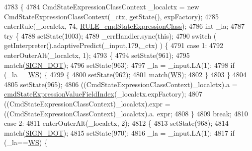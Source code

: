 \begin{DoxyCode}
4783                                                                                                            
                           \{
4784     CmdStateExpressionClassContext \_localctx = \textcolor{keyword}{new} CmdStateExpressionClassContext(\_ctx, getState(), 
      expFactory);
4785     enterRule(\_localctx, 74, \hyperlink{classgov_1_1nasa_1_1jpf_1_1inspector_1_1server_1_1expression_1_1parser_1_1_expression_grammar_parser_ae2659147bb430d58143ab16a6eb73b15}{RULE\_cmdStateExpressionClass});
4786     \textcolor{keywordtype}{int} \_la;
4787     \textcolor{keywordflow}{try} \{
4788       setState(1003);
4789       \_errHandler.sync(\textcolor{keyword}{this});
4790       \textcolor{keywordflow}{switch} ( getInterpreter().adaptivePredict(\_input,179,\_ctx) ) \{
4791       \textcolor{keywordflow}{case} 1:
4792         enterOuterAlt(\_localctx, 1);
4793         \{
4794         setState(961);
4795         match(\hyperlink{classgov_1_1nasa_1_1jpf_1_1inspector_1_1server_1_1expression_1_1parser_1_1_expression_grammar_parser_af578d1cac8553bcf6f52608a4e9125f1}{SIGN\_DOT});
4796         setState(963);
4797         \_la = \_input.LA(1);
4798         \textcolor{keywordflow}{if} (\_la==\hyperlink{classgov_1_1nasa_1_1jpf_1_1inspector_1_1server_1_1expression_1_1parser_1_1_expression_grammar_parser_ace44714ae633c7b14794cc5a24d9ebf3}{WS}) \{
4799           \{
4800           setState(962);
4801           match(\hyperlink{classgov_1_1nasa_1_1jpf_1_1inspector_1_1server_1_1expression_1_1parser_1_1_expression_grammar_parser_ace44714ae633c7b14794cc5a24d9ebf3}{WS});
4802           \}
4803         \}
4804 
4805         setState(965);
4806         ((CmdStateExpressionClassContext)\_localctx).a = 
      \hyperlink{classgov_1_1nasa_1_1jpf_1_1inspector_1_1server_1_1expression_1_1parser_1_1_expression_grammar_parser_a300497ebff4ec0759e1a294e9d6a7920}{cmdStateExpressionValueFieldIndex}(\_localctx.expFactory);
4807          ((CmdStateExpressionClassContext)\_localctx).expr =  ((CmdStateExpressionClassContext)\_localctx).a.
      expr; 
4808         \}
4809         \textcolor{keywordflow}{break};
4810       \textcolor{keywordflow}{case} 2:
4811         enterOuterAlt(\_localctx, 2);
4812         \{
4813         setState(968);
4814         match(\hyperlink{classgov_1_1nasa_1_1jpf_1_1inspector_1_1server_1_1expression_1_1parser_1_1_expression_grammar_parser_af578d1cac8553bcf6f52608a4e9125f1}{SIGN\_DOT});
4815         setState(970);
4816         \_la = \_input.LA(1);
4817         \textcolor{keywordflow}{if} (\_la==\hyperlink{classgov_1_1nasa_1_1jpf_1_1inspector_1_1server_1_1expression_1_1parser_1_1_expression_grammar_parser_ace44714ae633c7b14794cc5a24d9ebf3}{WS}) \{

\end{DoxyCode}
